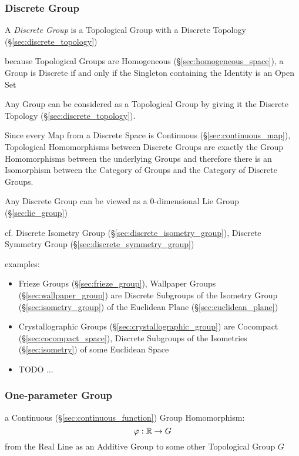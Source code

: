 \subsubsection{Discrete Group}\label{sec:discrete_group}

A \emph{Discrete Group} is a Topological Group with a Discrete Topology
(\S\ref{sec:discrete_topology})

because Topological Groups are Homogeneous (\S\ref{sec:homogeneous_space}), a
Group is Discrete if and only if the Singleton containing the Identity is an
Open Set

Any Group can be considered as a Topological Group by giving it the Discrete
Topology (\S\ref{sec:discrete_topology}).

Since every Map from a Discrete Space is Continuous
(\S\ref{sec:continuous_map}), Topological Homomorphisms between Discrete Groups
are exactly the Group Homomorphisms between the underlying Groups and therefore
there is an Isomorphism between the Category of Groups and the Category of
Discrete Groups.

Any Discrete Group can be viewed as a $0$-dimensional Lie Group
(\S\ref{sec:lie_group}) %

cf. Discrete Isometry Group (\S\ref{sec:discrete_isometry_group}), Discrete
Symmetry Group (\S\ref{sec:discrete_symmetry_group})

examples:
\begin{itemize}
  \item Frieze Groups (\S\ref{sec:frieze_group}), Wallpaper Groups
    (\S\ref{sec:wallpaper_group}) are Discrete Subgroups of the Isometry Group
    (\S\ref{sec:isometry_group}) of the Euclidean Plane
    (\S\ref{sec:euclidean_plane})
  \item Crystallographic Groups (\S\ref{sec:crystallographic_group}) are
    Cocompact (\S\ref{sec:cocompact_space}), Discrete Subgroups of the
    Isometries (\S\ref{sec:isometry}) of some Euclidean Space
  \item TODO
  ...
\end{itemize}



\subsubsection{One-parameter Group}\label{sec:one_parameter_group}

a Continuous (\S\ref{sec:continuous_function}) Group Homomorphism:
\[
  \varphi : \mathbb{R} \rightarrow G
\]
from the Real Line as an Additive Group to some other Topological Group $G$

